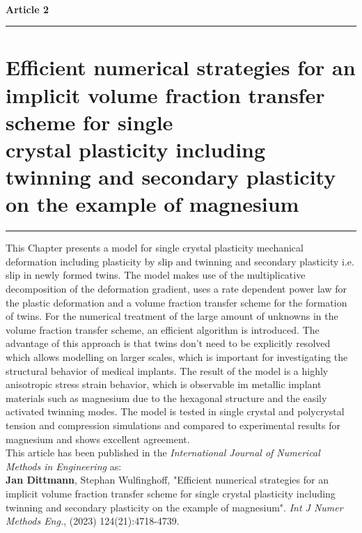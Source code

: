 \ \vspace{1cm} \\
\Large {\bf Article 2}
\normalsize
\vspace{0.3cm}
\hrule
\section*{\Large \centering Efficient numerical strategies for an implicit
volume fraction transfer scheme for single \\ crystal plasticity including twinning and secondary plasticity on the example of magnesium}
\hrule
\vspace{1.5cm}

This Chapter presents a model for single crystal plasticity mechanical deformation including plasticity by slip and twinning and secondary plasticity i.e. slip in newly formed twins. The model makes use of the multiplicative decomposition of the deformation gradient, uses a rate dependent power law for the plastic deformation and a volume fraction transfer scheme for the formation of twins. For the numerical treatment of the large amount of unknowns in the volume fraction transfer scheme, an efficient algorithm is introduced. The advantage of this approach is that twins don't need to be explicitly resolved which allows modelling on larger scales, which is important for investigating the structural behavior of medical implants. The result of the model is a highly anisotropic stress strain behavior, which is observable im metallic implant materials such as magnesium due to the hexagonal structure and the easily activated twinning modes. The model is tested in single crystal and polycrystal tension and compression simulations and compared to experimental results for magnesium and shows excellent agreement. \\

This article has been published in the \textit{International Journal of Numerical Methods in Engineering} as: \vspace{0.3cm}\\
{\small\textbf{Jan Dittmann}, Stephan Wulfinghoff, "Efficient numerical strategies for an implicit volume fraction transfer scheme for single crystal plasticity including twinning and secondary plasticity on the example of magnesium". \textit{Int J Numer Methods Eng.}, (2023) 124(21):4718-4739.} \\

